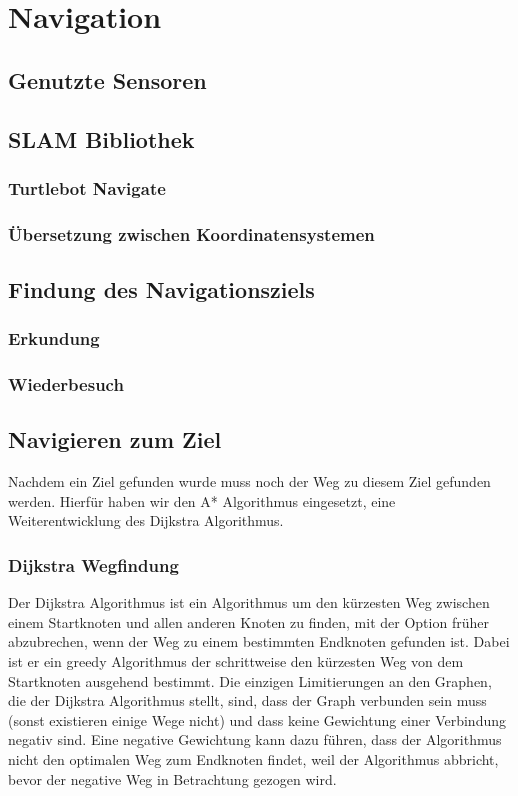 \section{Navigation}\label{sec:navigation}
\subsection{Genutzte Sensoren}\label{subsec:genutzte-sensoren}

\subsection{SLAM Bibliothek}\label{subsec:slam-bibliothek}

\subsubsection{Turtlebot Navigate} %
\subsubsection{Übersetzung zwischen Koordinatensystemen}
\subsection{Findung des Navigationsziels}\label{subsec:findung-des-navigationsziels}

\subsubsection{Erkundung}
\subsubsection{Wiederbesuch}
\subsection{Navigieren zum Ziel}\label{subsec:navigierung-zum-ziel}
Nachdem ein Ziel gefunden wurde muss noch der Weg zu diesem Ziel gefunden werden.
Hierfür haben wir den A* Algorithmus eingesetzt, eine Weiterentwicklung des Dijkstra Algorithmus.
\subsubsection{Dijkstra Wegfindung}
Der Dijkstra Algorithmus ist ein Algorithmus um den kürzesten Weg zwischen einem Startknoten und allen anderen Knoten
zu finden, mit der Option früher abzubrechen, wenn der Weg zu einem bestimmten Endknoten gefunden ist.
Dabei ist er ein greedy Algorithmus der schrittweise den kürzesten Weg von dem Startknoten ausgehend bestimmt.
Die einzigen Limitierungen an den Graphen, die der Dijkstra Algorithmus stellt, sind, dass der Graph verbunden sein muss
(sonst existieren einige Wege nicht) und dass keine Gewichtung einer Verbindung negativ sind.
Eine negative Gewichtung kann dazu führen, dass der Algorithmus nicht den optimalen Weg zum Endknoten findet, weil der Algorithmus abbricht, bevor der negative
Weg in Betrachtung gezogen wird.

